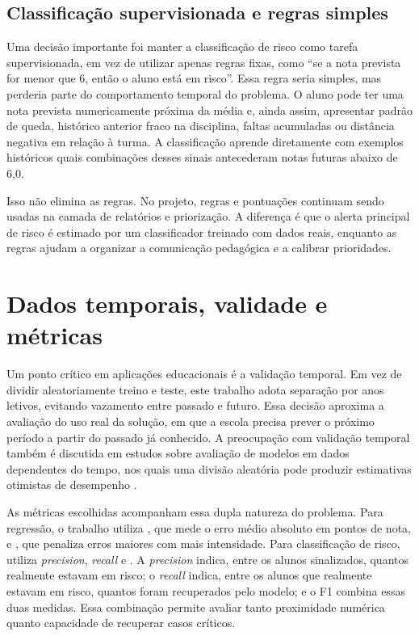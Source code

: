 \subsection{Classifica\c{c}\~ao supervisionada e regras simples}

Uma decis\~ao importante foi manter a classifica\c{c}\~ao de risco como tarefa supervisionada, em vez de utilizar apenas regras fixas, como ``se a nota prevista for menor que 6, ent\~ao o aluno est\'a em risco''. Essa regra seria simples, mas perderia parte do comportamento temporal do problema. O aluno pode ter uma nota prevista numericamente pr\'oxima da m\'edia e, ainda assim, apresentar padr\~ao de queda, hist\'orico anterior fraco na disciplina, faltas acumuladas ou dist\^ancia negativa em rela\c{c}\~ao \`a turma. A classifica\c{c}\~ao aprende diretamente com exemplos hist\'oricos quais combina\c{c}\~oes desses sinais antecederam notas futuras abaixo de 6,0.

Isso n\~ao elimina as regras. No projeto, regras e pontua\c{c}\~oes continuam sendo usadas na camada de relat\'orios e prioriza\c{c}\~ao. A diferen\c{c}a \'e que o alerta principal de risco \'e estimado por um classificador treinado com dados reais, enquanto as regras ajudam a organizar a comunica\c{c}\~ao pedag\'ogica e a calibrar prioridades.

\section{Dados temporais, validade e m\'etricas}
\label{sec:temporalidade}

Um ponto cr\'itico em aplica\c{c}\~oes educacionais \'e a valida\c{c}\~ao temporal. Em vez de dividir aleatoriamente treino e teste, este trabalho adota separa\c{c}\~ao por anos letivos, evitando vazamento entre passado e futuro. Essa decis\~ao aproxima a avalia\c{c}\~ao do uso real da solu\c{c}\~ao, em que a escola precisa prever o pr\'oximo per\'iodo a partir do passado j\'a conhecido. A preocupa\c{c}\~ao com valida\c{c}\~ao temporal tamb\'em \'e discutida em estudos sobre avalia\c{c}\~ao de modelos em dados dependentes do tempo, nos quais uma divis\~ao aleat\'oria pode produzir estimativas otimistas de desempenho \cite{bergmeir2018}.

As m\'etricas escolhidas acompanham essa dupla natureza do problema. Para regress\~ao, o trabalho utiliza , que mede o erro m\'edio absoluto em pontos de nota, e , que penaliza erros maiores com mais intensidade. Para classifica\c{c}\~ao de risco, utiliza \textit{precision}, \textit{recall} e . A \textit{precision} indica, entre os alunos sinalizados, quantos realmente estavam em risco; o \textit{recall} indica, entre os alunos que realmente estavam em risco, quantos foram recuperados pelo modelo; e o F1 combina essas duas medidas. Essa combina\c{c}\~ao permite avaliar tanto proximidade num\'erica quanto capacidade de recuperar casos cr\'iticos.

